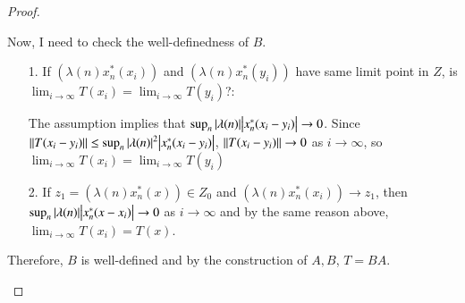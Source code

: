 \documentclass[a4paper, 12pt]{article}
\theoremstyle{Mydefinition}
\theoremstyle{Mytheorem}
\begin{document}
\begin{proof}
\begin{enumerate}
        Now, I need to check the well-definedness of $B$.
        
        \begin{enumerate}
            \item[1.] If $(\lambda(n) x_n^*(x_i))$ and $(\lambda(n) x_n^*(y_i))$ have same limit point in $Z$, is $\lim_{i\rightarrow \infty} T(x_i) = \lim_{i\rightarrow \infty} T(y_i)$?:
            
            \noindent The assumption implies that $\sup_n \abs{\lambda(n)} \abs{x_n^*(x_i-y_i)}\rightarrow 0$. Since $\norm{T(x_i-y_i)}\leq \sup_{n} \abs{\lambda(n)}^2 \abs{x_n^*(x_i-y_i)}$, $\norm{T(x_i-y_i)}\rightarrow 0$ as $i\rightarrow \infty$, so $\lim_{i\rightarrow \infty}T(x_i) = \lim_{i\rightarrow \infty} T(y_i)$
            \item[2.] If $z_1 = (\lambda(n) x_n^*(x))\in Z_0$ and $(\lambda(n)x_n^*(x_i))\rightarrow z_1$, then $\sup_n \abs{\lambda(n)}\abs{x_n^*(x-x_i)}\rightarrow 0$ as $i\rightarrow \infty$ and by the same reason above, $\lim_{i\rightarrow \infty} T(x_i) = T(x)$.
        \end{enumerate}
        Therefore, $B$ is well-defined and by the construction of $A,B$, $T=BA$.
    \end{enumerate}
\end{proof}
\end{document}

